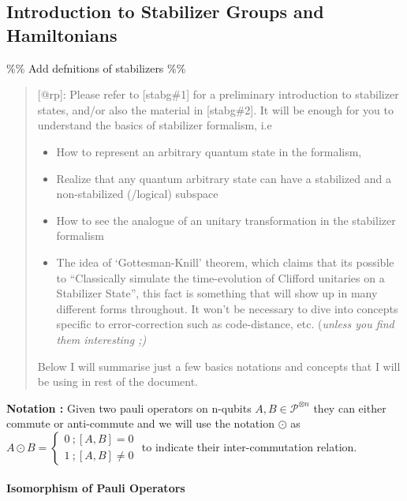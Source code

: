 \documentclass[
]{article}
\author{}
\date{}
\providecommand{\tightlist}{%
  \setlength{\itemsep}{0pt}\setlength{\parskip}{0pt}}
\begin{document}
\hypertarget{introduction-to-stabilizer-groups-and-hamiltonians}{%
\subsection{Introduction to Stabilizer Groups and
Hamiltonians}\label{introduction-to-stabilizer-groups-and-hamiltonians}}

\%\% Add defnitions of stabilizers \%\%

\begin{quote}
{[}@rp{]}: Please refer to {[}stabg\#1{]} for a preliminary introduction
to stabilizer states, and/or also the material in {[}stabg\#2{]}. It
will be enough for you to understand the basics of stabilizer formalism,
i.e

\begin{itemize}
\tightlist
\item
  How to represent an arbitrary quantum state in the formalism,
\item
  Realize that any quantum arbitrary state can have a stabilized and a
  non-stabilized (/logical) subspace
\item
  How to see the analogue of an unitary transformation in the stabilizer
  formalism
\item
  The idea of `Gottesman-Knill' theorem, which claims that its possible
  to ``Classically simulate the time-evolution of Clifford unitaries on
  a Stabilizer State'', this fact is something that will show up in many
  different forms throughout. It won't be necessary to dive into
  concepts specific to error-correction such as code-distance, etc.
  (\emph{unless you find them interesting ;)}
\end{itemize}

Below I will summarise just a few basics notations and concepts that I
will be using in rest of the document.
\end{quote}

\textbf{Notation :} Given two pauli operators on n-qubits
\(A,B \in \mathcal{P}^{\otimes n}\) they can either commute or
anti-commute and we will use the notation \(\odot\) as
\(A \odot B = \begin{cases} 0 \: ; [A,B] =0 \\ 1 \: ; [A,B] \neq 0 \end{cases}\)
to indicate their inter-commutation relation.

\hypertarget{isomorphism-of-pauli-operators}{%
\paragraph{Isomorphism of Pauli
Operators}\label{isomorphism-of-pauli-operators}}
\end{document}
